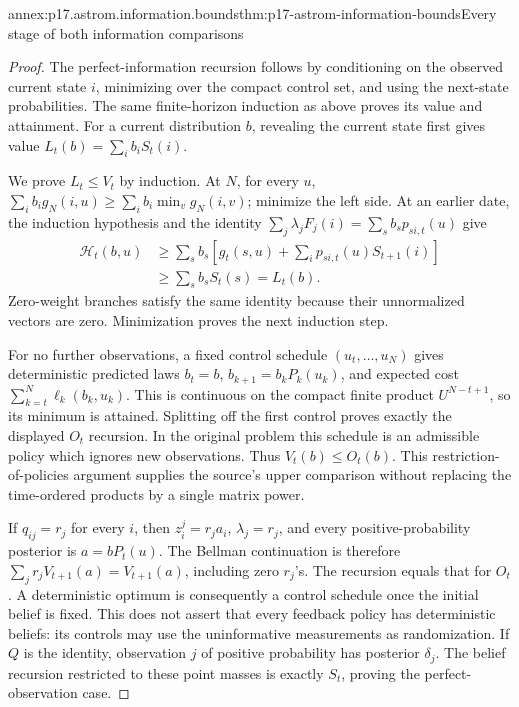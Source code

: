 \begin{annexitem}{annex:p17.astrom.information.bounds}{thm:p17-astrom-information-bounds}{Every stage of both information comparisons}
\begin{proof}
The perfect-information recursion follows by conditioning
on the observed current state \(i\), minimizing over
the compact control set, and using the next-state
probabilities. The same finite-horizon induction as
above proves its value and attainment.
For a current distribution \(b\), revealing the current
state first gives value \(L_t(b)=\sum_i b_iS_t(i)\).

We prove \(L_t\leq V_t\) by induction.
At \(N\), for every \(u\),
\(\sum_i b_i g_N(i,u)\geq\sum_i b_i\min_vg_N(i,v)\);
minimize the left side.
At an earlier date, the induction hypothesis and
the identity
\(\sum_j\lambda_jF_j(i)=\sum_s b_sp_{si,t}(u)\)
give
\[
 \begin{split}
 \mathcal H_t(b,u)
 &\geq \sum_s b_s
       [g_t(s,u)+\sum_i p_{si,t}(u)S_{t+1}(i)]\\
 &\geq \sum_s b_s S_t(s)=L_t(b).
 \end{split}
\]
Zero-weight branches satisfy the same identity because
their unnormalized vectors are zero. Minimization
proves the next induction step.

For no further observations, a fixed control schedule
\((u_t,\ldots,u_N)\) gives deterministic predicted laws
\(b_t=b\), \(b_{k+1}=b_kP_k(u_k)\), and expected cost
\(\sum_{k=t}^N\ell_k(b_k,u_k)\).
This is continuous on the compact finite product
\(U^{N-t+1}\), so its minimum is attained.
Splitting off the first control proves exactly the
displayed \(O_t\) recursion. In the original problem
this schedule is an admissible policy which ignores
new observations. Thus \(V_t(b)\leq O_t(b)\).
This restriction-of-policies argument supplies the
source's upper comparison without replacing the
time-ordered products by a single matrix power.

If \(q_{ij}=r_j\) for every \(i\), then
\(z_i^j=r_ja_i\), \(\lambda_j=r_j\), and every
positive-probability posterior is \(a=bP_t(u)\).
The Bellman continuation is therefore
\(\sum_jr_j V_{t+1}(a)=V_{t+1}(a)\), including
zero \(r_j\)'s. The recursion equals that for \(O_t\).
A deterministic optimum is consequently a control
schedule once the initial belief is fixed.
This does not assert that every feedback policy has
deterministic beliefs: its controls may use the
uninformative measurements as randomization.
If \(Q\) is the identity, observation \(j\) of positive
probability has posterior \(\delta_j\).
The belief recursion restricted to these point masses
is exactly \(S_t\), proving the perfect-observation case.


\end{proof}
\end{annexitem}

